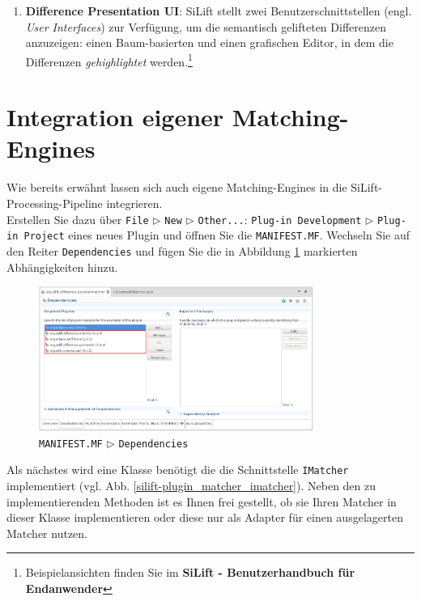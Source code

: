 \documentclass[a4paper]{scrartcl}
\begin{document}
\begin{enumerate}
\item \textbf{Difference Presentation UI}:
SiLift stellt zwei Benutzerschnittstellen (engl. \textit{User Interfaces}) zur Verfügung, um die semantisch gelifteten Differenzen anzuzeigen: 
einen Baum-basierten  und einen grafischen Editor, in dem die Differenzen \textit{gehighlightet} werden.\footnote{Beispielansichten finden Sie im \textbf{SiLift - Benutzerhandbuch für Endanwender}}
\end{enumerate}

\section{Integration eigener Matching-Engines} \label{sec:own_matching_engine}

Wie bereits erwähnt lassen sich auch eigene Matching-Engines in die SiLift-Processing-Pipeline integrieren.\\
Erstellen Sie dazu über \texttt{File} $\triangleright$ \texttt{New} $\triangleright$ \texttt{Other...}: \texttt{Plug-in Development} $\triangleright$ \texttt{Plug-in Project} eines neues Plugin und öffnen Sie die \texttt{MANIFEST.MF}.
Wechseln Sie auf den Reiter \texttt{Dependencies} und fügen Sie die in Abbildung \ref{silift-plugin_matcher_manifest_dependencies} markierten Abhängigkeiten hinzu.

\begin{figure}[H]
\centering
\includegraphics[width=0.8\textwidth]{graphics/silift-plugin_matcher_manifest_dependencies}
\caption{\texttt{MANIFEST.MF} $\triangleright$ \texttt{Dependencies}}
\label{silift-plugin_matcher_manifest_dependencies}
\end{figure}

Als nächstes wird eine Klasse benötigt die die Schnittstelle \texttt{IMatcher} implementiert (vgl. Abb. \ref{silift-plugin_matcher_imatcher}).
Neben den zu implementierenden Methoden ist es Ihnen frei gestellt, ob sie Ihren Matcher in dieser Klasse implementieren oder diese nur als Adapter für einen ausgelagerten Matcher nutzen.
\end{document}
